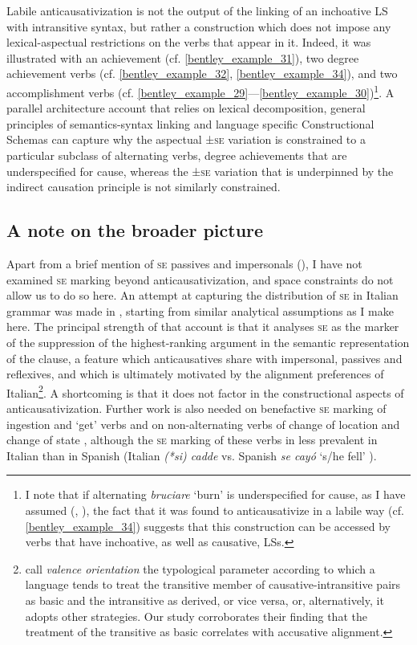\documentclass[output=paper,colorlinks,citecolor=brown
]{langscibook}
\begin{document}
Labile anticausativization is not the output of the linking of an inchoative LS with intransitive syntax, but rather a construction which does not impose any lexical-aspectual restrictions on the verbs that appear in it. Indeed, it was illustrated with an achievement (cf. \ref{bentley_example_31}), two degree achievement verbs (cf. \ref{bentley_example_32}, \ref{bentley_example_34}), and two accomplishment verbs (cf. \ref{bentley_example_29}—\ref{bentley_example_30})\footnote{I note that if alternating \textit{bruciare} ‘burn’ is underspecified for cause, as I have assumed (, ), the fact that it was found to anticausativize in a labile way (cf. \ref{bentley_example_34}) suggests that this construction can be accessed by verbs that have inchoative, as well as causative, LSs.}.  A parallel architecture account that relies on lexical decomposition, general principles of semantics-syntax linking and language specific Constructional Schemas can capture why the aspectual ±\textsc{se} variation is constrained to a particular subclass of alternating verbs, degree achievements that are underspecified for cause, whereas the ±\textsc{se} variation that is underpinned by the indirect causation principle is not similarly constrained.  

\subsection{A note on the broader picture}
\label{bentley_section_5.5}

Apart from a brief mention of \textsc{se} passives and impersonals (), I have not examined \textsc{se} marking beyond anticausativization, and space constraints do not allow us to do so here. An attempt at capturing the distribution of \textsc{se} in Italian grammar was made in \citet{bentley2006split}, starting from similar analytical assumptions as I make here. The principal strength of that account is that it analyses \textsc{se} as the marker of the suppression of the highest-ranking argument in the semantic representation of the clause, a feature which anticausatives share with impersonal, passives and reflexives, and which is ultimately motivated by the alignment preferences of Italian\footnote{\citet{nichols2004transitivizing} call \textit{valence orientation} the typological parameter according to which a language tends to treat the transitive member of causative-intransitive pairs as basic and the intransitive as derived, or vice versa, or, alternatively, it adopts other strategies. Our study corroborates their finding that the treatment of the transitive as basic correlates with accusative alignment.}.  A shortcoming is that it does not factor in the constructional aspects of anticausativization. Further work is also needed on benefactive \textsc{se} marking of ingestion and ‘get’ verbs \citep[153—154]{bentley2006split} and on non-alternating verbs of change of location and change of state \citep{miguel2000operador,gonzales2006construcciones,jimenez2017causativity}, although the \textsc{se} marking of these verbs in less prevalent in Italian than in Spanish (Italian \textit{(*si) cadde} vs. Spanish \textit{se cayó} ‘s/he fell’ ). 
\end{document}
